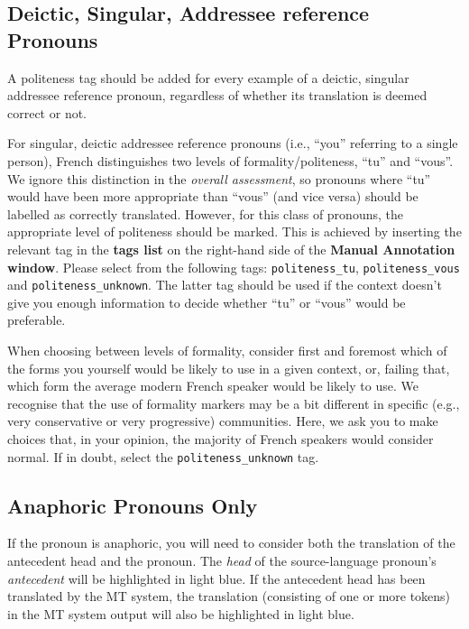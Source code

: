 \documentclass[11pt]{article} %
\newcommand\tag[1]{\texttt{#1}}
\begin{document}
\subsection{Deictic, Singular, Addressee reference Pronouns}
\label{AddresseeGuidelines}
A politeness tag should be added for every example of a deictic, singular addressee reference pronoun, regardless of whether its translation is deemed correct or not.

For singular, deictic addressee reference pronouns (i.e., ``you'' referring to
a single person), French distinguishes two levels of formality/politeness,
``tu'' and ``vous''. We ignore this distinction in the \emph{overall
assessment},  so pronouns where ``tu'' would have been more appropriate
than ``vous'' (and vice versa) should be labelled as correctly translated.
However, for this class of pronouns, the appropriate level of politeness should
be marked. This is achieved by inserting the relevant tag in the \textbf{tags list} on the
right-hand side of the \textbf{Manual Annotation window}. Please select from the following tags:
\tag{politeness\_tu}, \tag{politeness\_vous} and \tag{politeness\_unknown}.
The latter tag should be used if the context doesn't give you enough information
to decide whether ``tu'' or ``vous'' would be preferable.

When choosing between levels of formality, consider first and foremost which of
the forms you yourself would be likely to use in a given context, or, failing
that, which form the average modern French speaker would be likely to use. We
recognise that the use of formality markers may be a bit different in specific
(e.g., very conservative or very progressive) communities. Here, we ask you to
make choices that, in your opinion, the majority of French speakers would
consider normal. If in doubt, select the
\tag{politeness\_unknown} tag.

\subsection{Anaphoric Pronouns Only}
\label{AnaphoricGuidelines}

If the pronoun is anaphoric, you will need to consider both the translation of the antecedent head and the pronoun. The \textit{head} of the source-language pronoun's \textit{antecedent} will be highlighted in light blue. If the antecedent head has been translated by the MT system, the translation (consisting of one or more tokens) in the MT system output will also be highlighted in light blue.
\end{document}
